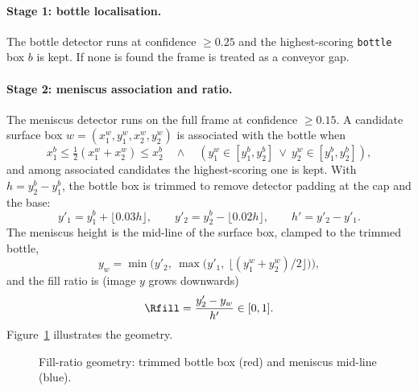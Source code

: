 \paragraph{Stage 1: bottle localisation.} The bottle detector runs at confidence $\geq0.25$ and the highest-scoring \texttt{bottle} box $b$ is kept. If none is found the frame is treated as a conveyor gap.

\paragraph{Stage 2: meniscus association and ratio.} The meniscus detector runs on the full frame at confidence $\geq0.15$. A candidate surface box $w=(x^w_1,y^w_1,x^w_2,y^w_2)$ is associated with the bottle when
\begin{equation}
    x^b_1 \leq \tfrac{1}{2}(x^w_1+x^w_2) \leq x^b_2
    \quad\wedge\quad
    \left(y^w_1\in[y^b_1,y^b_2] \ \vee\ y^w_2\in[y^b_1,y^b_2]\right),
    \label{eq:assoc}
\end{equation}
and among associated candidates the highest-scoring one is kept. With $h=y^b_2-y^b_1$, the bottle box is trimmed to remove detector padding at the cap and the base:
\begin{equation}
    y'_1 = y^b_1+\lfloor 0.03h\rfloor,\qquad y'_2 = y^b_2-\lfloor 0.02h\rfloor,\qquad h'=y'_2-y'_1 .
    \label{eq:trim}
\end{equation}
The meniscus height is the mid-line of the surface box, clamped to the trimmed bottle,
\begin{equation}
    y_w = \min\!\Big(y'_2,\ \max\!\big(y'_1,\ \lfloor (y^w_1+y^w_2)/2\rfloor\big)\Big),
\end{equation}
and the fill ratio is (image $y$ grows downwards)
\begin{equation}
    \Rfill = \frac{y'_2-y_w}{h'}\in[0,1].
    \label{eq:rfill}
\end{equation}
Figure~\ref{fig:fill-geom} illustrates the geometry.

\begin{figure}[htbp]
\centering
{}
\caption{Fill-ratio geometry: trimmed bottle box (red) and meniscus mid-line (blue).}
\label{fig:fill-geom}
\end{figure}

